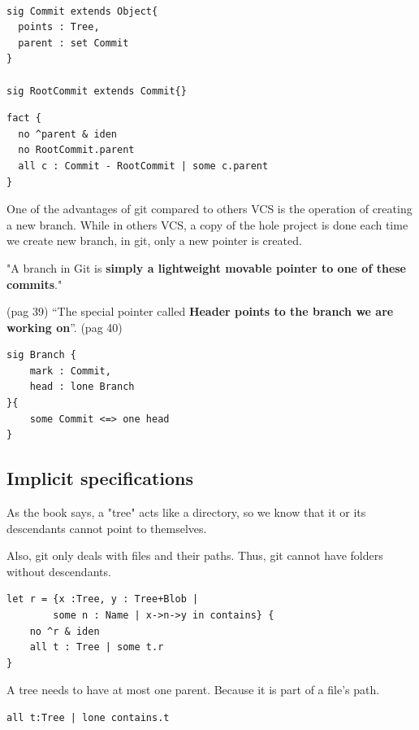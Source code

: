 \begin{lstlisting}

sig Commit extends Object{
  points : Tree,
  parent : set Commit
}

sig RootCommit extends Commit{}

\end{lstlisting}

\begin{lstlisting}
fact {
  no ^parent & iden
  no RootCommit.parent
  all c : Commit - RootCommit | some c.parent	
}

\end{lstlisting}

One of the advantages of git compared to others VCS is the operation
of creating a new branch. While in others VCS, a copy of the hole project is
done each time we create new branch, in git, only a new pointer is created.

"A branch in Git is {\bf simply a 
lightweight movable pointer to one of these commits}." \par \cite{progit} 
(pag 39)
``The special pointer called {\bf Header 
points to the branch we are working on}''. \cite{progit} (pag 40)

\begin{lstlisting}
sig Branch {
	mark : Commit,
	head : lone Branch
}{
	some Commit <=> one head
}
\end{lstlisting}


\subsection{Implicit specifications}

As the book \cite{gitComm} says, a "tree" acts
like a directory, so we know that it or its 
descendants cannot point to themselves.

Also, git only deals with files and their paths. Thus, git cannot have
folders without descendants.

\begin{lstlisting}
let r = {x :Tree, y : Tree+Blob | 
		some n : Name | x->n->y in contains} {
	no ^r & iden
	all t : Tree | some t.r
}
\end{lstlisting}

A tree needs to have at most one parent. Because it is part
of a file's path.
\begin{lstlisting}
all t:Tree | lone contains.t
\end{lstlisting} \par

